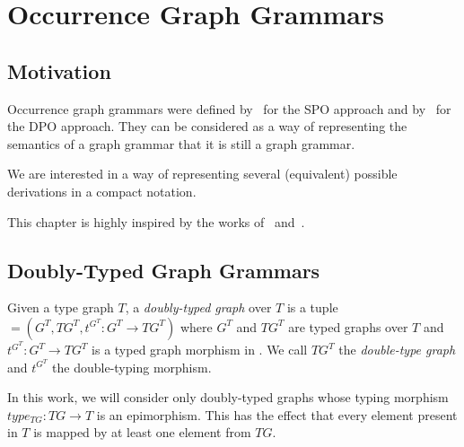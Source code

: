 \chapter{Occurrence Graph Grammars}

\section{Motivation}

Occurrence graph grammars were defined by~\cite{Ribeiro1996} for the SPO approach and by~\cite{Corradini1996} for the DPO approach. They can be considered as a way of representing the  semantics of a graph grammar that it is still a graph grammar.

We are interested in a way of representing several (equivalent) possible derivations in a compact notation.

  This chapter is highly inspired by the works of~\cite{Ribeiro1996} and~\cite{Corradini1996}.

\section{Doubly-Typed Graph Grammars}

\begin{definition} Given a type graph $T$, a \emph{doubly-typed graph} \doublyTypedGraph{} over $T$ is a tuple \doublyTypedGraph $= \left(G^T,TG^T, t^{G^T} : G^T \rightarrow TG^T\right)$ where $G^T$ and $TG^T$ are typed graphs over $T$ and \mbox{$t^{G^T} : G^T \rightarrow TG^T$} is a typed graph morphism in \typedGraphCategory{}. We call $TG^T$ the \emph{double-type graph} and $t^{G^T}$ the double-typing morphism.
\end{definition}

\begin{remark} In this work, we will consider only doubly-typed graphs whose typing morphism $type_{TG} : TG \rightarrow T$ is an epimorphism. This has the effect that every element present in $T$ is mapped by at least one element from $TG$.
\end{remark}

